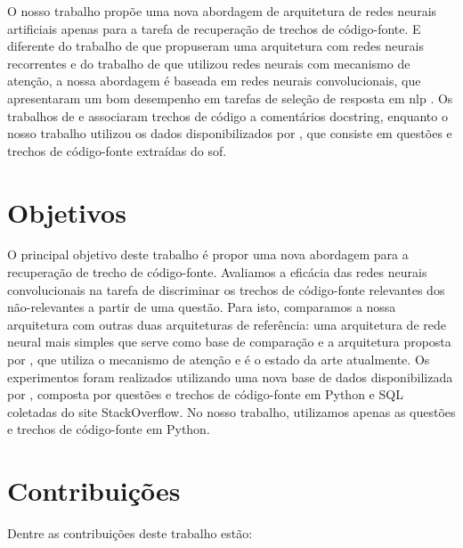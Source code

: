 O nosso trabalho propõe uma nova abordagem de arquitetura de redes neurais artificiais apenas para a tarefa de recuperação de trechos de código-fonte. E diferente do trabalho de \cite{Gu-deep-code-search:2018} que propuseram uma arquitetura com redes neurais recorrentes e do trabalho de \cite{cambronero-deep-learning-code-search:2019} que utilizou redes neurais com mecanismo de atenção, a nossa abordagem é baseada em redes neurais convolucionais, que apresentaram um bom desempenho em tarefas de seleção de resposta em \acrshort{nlp} \citep{feng-2015, tan-lstm-qa, wen-joint-modeling-question-answer-2019}. Os trabalhos de \cite{Gu-deep-code-search:2018} e \cite{cambronero-deep-learning-code-search:2019} associaram trechos de código a comentários \gls{docstring}, enquanto o nosso trabalho utilizou os dados disponibilizados por \cite{yao-2018}, que consiste em questões e trechos de código-fonte extraídas do \Gls{sof}.

\section{Objetivos}
\label{sec:objetivo}

O principal objetivo deste trabalho é propor uma nova abordagem  para a recuperação de trecho de código-fonte. Avaliamos a eficácia das redes neurais convolucionais na tarefa de discriminar os trechos de código-fonte relevantes dos não-relevantes a partir de uma questão. Para isto, comparamos a nossa arquitetura com outras duas arquiteturas de referência: uma arquitetura de rede neural mais simples que serve como base de comparação e a arquitetura proposta por \cite{cambronero-deep-learning-code-search:2019}, que utiliza o mecanismo de atenção e é o estado da arte atualmente. Os experimentos foram realizados utilizando uma nova base de dados disponibilizada por \cite{yao-2018}, composta por questões e trechos de código-fonte em Python e SQL coletadas do site StackOverflow. No nosso trabalho, utilizamos apenas as questões e trechos de código-fonte em Python.

\section{Contribuições}
\label{sec:contribucoes}

Dentre as contribuições deste trabalho estão:


